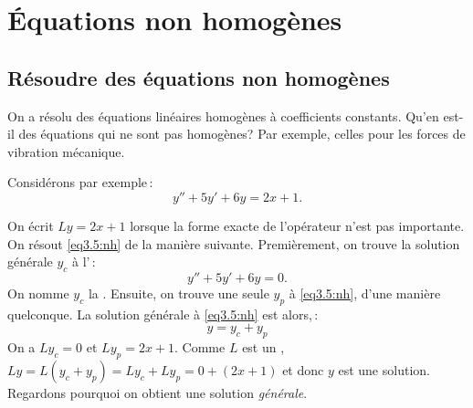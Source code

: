 
\sectionnewpage
\section{Équations non homogènes }
\label{sec:nonhom}
%

\subsection{Résoudre des équations non homogènes }

On a résolu des équations linéaires homogènes à coefficients constants. 
Qu'en est-il des équations qui ne sont pas homogènes?
Par exemple, celles pour les forces de vibration mécanique. 


Considérons par exemple\,:  
\begin{equation} \label{eq3.5:nh}
y'' + 5y'+ 6y = 2x+1 .
\end{equation}

On écrit  $Ly = 2x+1$ lorsque la forme exacte de l'opérateur n'est pas importante. 
On résout \eqref{eq3.5:nh} de la manière suivante. Premièrement, on trouve la solution générale  $y_c$
à l'\emph{}\,: 
\begin{equation} \label{eq3.5:h}
y'' + 5y'+ 6y = 0 .
\end{equation}
On nomme $y_c$ la \emph{}.
Ensuite, on trouve une seule \emph{} $y_p$ à \eqref{eq3.5:nh}, d'une manière quelconque.  La solution générale à \eqref{eq3.5:nh} est alors,\,: 
\begin{equation*}
y = y_c + y_p
\end{equation*}
On a  $L y_c = 0$ et $L y_p = 2x+1$.  Comme
$L$ est un \emph{}, $L y = L ( y_c + y_p) = L y_c + L y_p = 0
+ (2x+1)$ et donc $y$ est une solution. Regardons pourquoi on obtient une  solution  \emph{générale}.

